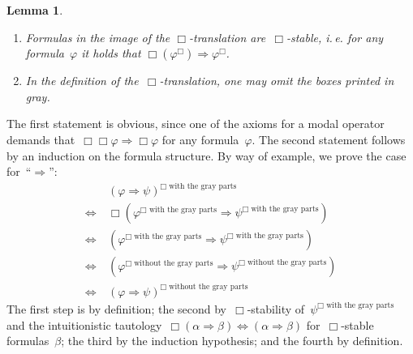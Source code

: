 \documentclass[10pt,reqno,a4paper]{amsbook}
\makeatletter
\theoremstyle{definition}
\theoremstyle{plain}
\newtheorem{lemma}[defn]{Lemma}
\theoremstyle{remark}
\newcommand{\?}{\,{:}\,}
\renewcommand{\_}{\mathpunct{.}\,}
\newcommand{\ie}{i.\,e.\@\xspace}
\renewenvironment{proof}[1][\proofname]{\par
  \pushQED{\qed}%
  \normalfont \topsep6\p@\@plus6\p@\relax
  \trivlist
  \item[\hskip\labelsep
        \itshape
    #1\@addpunct{.}]\ignorespaces
}{%
  \popQED\endtrivlist\@endpefalse
}
\makeatother
\begin{document}
\begin{lemma}\begin{enumerate}
\item Formulas in the image of the $\Box$-translation are~$\Box$-stable,
\ie for any formula~$\varphi$ it holds that
$\Box(\varphi^\Box) \Longrightarrow \varphi^\Box$.
\item In the definition of the~$\Box$-translation, one may omit the boxes
printed in gray.
\end{enumerate}\end{lemma}
\begin{proof}The first statement is obvious, since one of the axioms for a modal
operator demands that~$\Box\Box\varphi \Rightarrow \Box\varphi$ for any
formula~$\varphi$. The second statement follows by an induction on the
formula structure. By way of example, we prove the case for~``$\Rightarrow$'':
\newcommand{\withgray}{\text{$\Box$ with the gray parts}}
\newcommand{\withoutgray}{\text{$\Box$ without the gray parts}}
\begin{align*}
  &\ (\varphi \Rightarrow \psi)^\withgray \\
  \Longleftrightarrow &\ \Box(\varphi^\withgray \Rightarrow \psi^\withgray) \\
  \Longleftrightarrow &\ (\varphi^\withgray \Rightarrow \psi^\withgray) \\
  \Longleftrightarrow &\ (\varphi^\withoutgray \Rightarrow \psi^\withoutgray) \\
  \Longleftrightarrow &\ (\varphi \Rightarrow \psi)^\withoutgray
\end{align*}
The first step is by definition; the second by~$\Box$-stability
of~$\psi^\withgray$ and the intuitionistic tautology~$\Box(\alpha \Rightarrow
\beta) \Leftrightarrow (\alpha \Rightarrow \beta)$ for~$\Box$-stable
formulas~$\beta$; the third by the induction hypothesis; and the fourth by
definition.
\end{proof}
\end{document}
